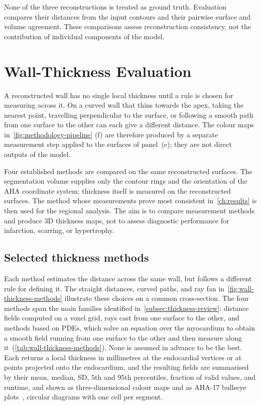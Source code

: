 None of the three reconstructions is treated as ground truth. Evaluation
compares their distances from the input contours and their pairwise surface
and volume agreement. These comparisons assess reconstruction consistency,
not the contribution of individual components of the model.

\section{Wall-Thickness Evaluation}
\label{sec:wall-thickness-protocol}
\noindent
A reconstructed wall has no single local thickness until a rule is chosen for
measuring across it. On a curved wall that thins towards the apex, taking the
nearest point, travelling perpendicular to the surface, or following a smooth
path from one surface to the other can each give a different distance. The
colour maps in~\cref{fig:methodology-pipeline} (f) are therefore produced by a
separate measurement step applied to the surfaces of panel~(e); they are not
direct outputs of the model.

Four established methods are compared on the same reconstructed surfaces. The segmentation volume
supplies only the contour rings and the orientation of the AHA coordinate
system; thickness itself is measured on the reconstructed surfaces. The
method whose measurements prove most consistent in~\cref{ch:results} is then
used for the regional analysis. The aim is to compare measurement methods and
produce 3D thickness maps, not to assess diagnostic performance for
infarction, scarring, or hypertrophy.

\subsection{Selected thickness methods}
\label{subsec:thickness-methods}
\noindent
Each method estimates the distance across the same wall, but follows a
different rule for defining it. The straight distances, curved paths, and ray
fan in~\cref{fig:wall-thickness-methods} illustrate these choices on a common
cross-section. The four methods span the main families identified in~\cref{subsec:thickness-review}: distance fields computed on a voxel grid, rays
cast from one surface to the other, and methods based on PDEs, which solve an equation over the
myocardium to obtain a smooth field running from one surface to the other
and then measure along it~(\cref{tab:wall-thickness-methods}). None is assumed in advance to be
the best. Each returns a local thickness in millimetres at the endocardial
vertices or at points projected onto the endocardium, and the resulting fields
are summarised by their mean, median, SD, 5th and 95th
percentiles, fraction of valid values, and runtime, and shown as
three-dimensional colour maps and as AHA-17 bullseye
plots~\parencite{cerqueira2002segmentation}, circular diagrams
with one cell per segment.

